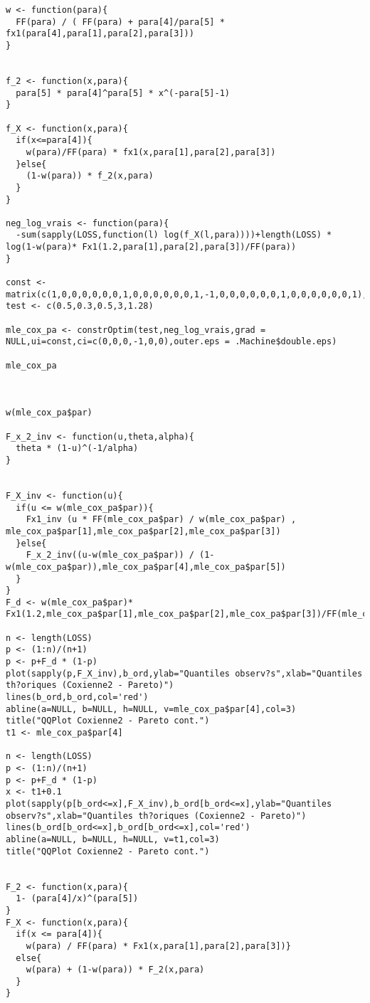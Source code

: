 \begin{verbatim}
w <- function(para){
  FF(para) / ( FF(para) + para[4]/para[5] * fx1(para[4],para[1],para[2],para[3]))
}


f_2 <- function(x,para){
  para[5] * para[4]^para[5] * x^(-para[5]-1)
}

f_X <- function(x,para){
  if(x<=para[4]){
    w(para)/FF(para) * fx1(x,para[1],para[2],para[3])
  }else{
    (1-w(para)) * f_2(x,para)
  } 
}

neg_log_vrais <- function(para){
  -sum(sapply(LOSS,function(l) log(f_X(l,para))))+length(LOSS) * log(1-w(para)* Fx1(1.2,para[1],para[2],para[3])/FF(para))
}

const <- matrix(c(1,0,0,0,0,0,0,1,0,0,0,0,0,0,1,-1,0,0,0,0,0,0,1,0,0,0,0,0,0,1),6,5)
test <- c(0.5,0.3,0.5,3,1.28)

mle_cox_pa <- constrOptim(test,neg_log_vrais,grad = NULL,ui=const,ci=c(0,0,0,-1,0,0),outer.eps = .Machine$double.eps)

mle_cox_pa



w(mle_cox_pa$par)

F_x_2_inv <- function(u,theta,alpha){
  theta * (1-u)^(-1/alpha)
}


F_X_inv <- function(u){
  if(u <= w(mle_cox_pa$par)){
    Fx1_inv (u * FF(mle_cox_pa$par) / w(mle_cox_pa$par) , mle_cox_pa$par[1],mle_cox_pa$par[2],mle_cox_pa$par[3])
  }else{
    F_x_2_inv((u-w(mle_cox_pa$par)) / (1-w(mle_cox_pa$par)),mle_cox_pa$par[4],mle_cox_pa$par[5])
  }
}
F_d <- w(mle_cox_pa$par)* Fx1(1.2,mle_cox_pa$par[1],mle_cox_pa$par[2],mle_cox_pa$par[3])/FF(mle_cox_pa$par)

n <- length(LOSS)
p <- (1:n)/(n+1)
p <- p+F_d * (1-p)
plot(sapply(p,F_X_inv),b_ord,ylab="Quantiles observ?s",xlab="Quantiles th?oriques (Coxienne2 - Pareto)")
lines(b_ord,b_ord,col='red')
abline(a=NULL, b=NULL, h=NULL, v=mle_cox_pa$par[4],col=3)
title("QQPlot Coxienne2 - Pareto cont.")
t1 <- mle_cox_pa$par[4]

n <- length(LOSS)
p <- (1:n)/(n+1)
p <- p+F_d * (1-p)
x <- t1+0.1
plot(sapply(p[b_ord<=x],F_X_inv),b_ord[b_ord<=x],ylab="Quantiles observ?s",xlab="Quantiles th?oriques (Coxienne2 - Pareto)")
lines(b_ord[b_ord<=x],b_ord[b_ord<=x],col='red')
abline(a=NULL, b=NULL, h=NULL, v=t1,col=3)
title("QQPlot Coxienne2 - Pareto cont.")


F_2 <- function(x,para){
  1- (para[4]/x)^(para[5])
}
F_X <- function(x,para){
  if(x <= para[4]){
    w(para) / FF(para) * Fx1(x,para[1],para[2],para[3])}
  else{
    w(para) + (1-w(para)) * F_2(x,para)
  }
}



\end{verbatim}
